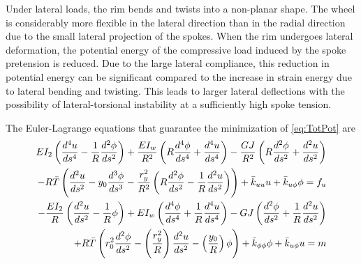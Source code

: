 \documentclass[\rootdir/thesis.tex]{subfiles}
\begin{document}
Under lateral loads, the rim bends and twists into a non-planar shape. The wheel is considerably more flexible in the lateral direction than in the radial direction due to the small lateral projection of the spokes. When the rim undergoes lateral deformation, the potential energy of the compressive load induced by the spoke pretension is reduced. Due to the large lateral compliance, this reduction in potential energy can be significant compared to the increase in strain energy due to lateral bending and twisting. This leads to larger lateral deflections with the possibility of lateral-torsional instability at a sufficiently high spoke tension.

The Euler-Lagrange equations that guarantee the minimization of \eqref{eq:TotPot} are
\begin{subequations}
\label{eq:lat_ode_2}
\begin{align}
\begin{split}
  EI_2\left( \frac{d^4u}{ds^4} - \frac{1}{R}\frac{d^2\phi}{ds^2} \right)
  + \frac{EI_w}{R^2}\left( R\frac{d^4\phi}{ds^4} + \frac{d^4u}{ds^4} \right)
  - \frac{GJ}{R^2}\left( R\frac{d^2\phi}{ds^2} + \frac{d^2u}{ds^2} \right)\\
  - R\bar{T}\left( \frac{d^2u}{ds^2} - y_0\frac{d^3\phi}{ds^3}
                  -\frac{r_y^2}{R^2}\left(R\frac{d^2\phi}{ds^2}
                  -\frac{1}{R}\frac{d^2u}{ds^2}\right) \right)
  + \bar{k}_{uu} u + \bar{k}_{u\phi} \phi = f_u
\end{split}\\
\begin{split}
  - \frac{EI_2}{R}\left( \frac{d^2u}{ds^2} - \frac{1}{R}\phi \right)
  + EI_w\left( \frac{d^4\phi}{ds^4} + \frac{1}{R}\frac{d^4u}{ds^4} \right)
  - GJ\left( \frac{d^2\phi}{ds^2} + \frac{1}{R}\frac{d^2u}{ds^2} \right)\\
  + R\bar{T}\left(r_0^2\frac{d^2\phi}{ds^2}
                  -\left(\frac{r_y^2}{R}\right)\frac{d^2u}{ds^2}
                  -\left(\frac{y_0}{R}\right)\phi\right)
  + \bar{k}_{\phi\phi} \phi + \bar{k}_{u\phi} u = m
\end{split}
\end{align}
\end{subequations}
\end{document}
